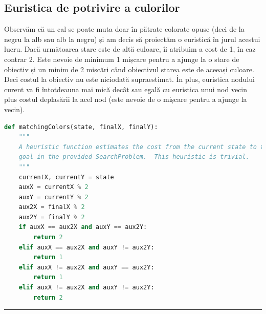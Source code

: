 \documentclass[a4paper,12pt]{report}
\begin{document}
 \subsection{Euristica de potrivire a culorilor}
 Observăm că un cal se poate muta doar în pătrate colorate opuse (deci de la negru la alb sau alb la negru) și am decis să proiectăm o euristică în jurul acestui lucru. Dacă următoarea stare este de altă culoare, îi atribuim a cost de 1, în caz contrar 2.  
 Este nevoie de minimum 1 mișcare pentru a ajunge la o stare de obiectiv și un minim de 2 mișcări când obiectivul starea este de aceeași culoare.
 Deci costul la obiectiv nu este niciodată supraestimat. În plus, euristica nodului curent va fi întotdeauna mai mică decât sau egală cu euristica unui nod vecin plus costul deplasării la acel nod (este nevoie de o mișcare pentru a ajunge la vecin).
  \begin{lstlisting}[language=Python]
 def matchingColors(state, finalX, finalY):
    """
    A heuristic function estimates the cost from the current state to the nearest
    goal in the provided SearchProblem.  This heuristic is trivial.
    """
    currentX, currentY = state
    auxX = currentX % 2
    auxY = currentY % 2
    aux2X = finalX % 2
    aux2Y = finalY % 2
    if auxX == aux2X and auxY == aux2Y:
        return 2
    elif auxX == aux2X and auxY != aux2Y:
        return 1
    elif auxX != aux2X and auxY == aux2Y:
        return 1
    elif auxX != aux2X and auxY != aux2Y:
        return 2 
\end{lstlisting}   
\rule{\textwidth}{0.5pt}
 
\end{document}
